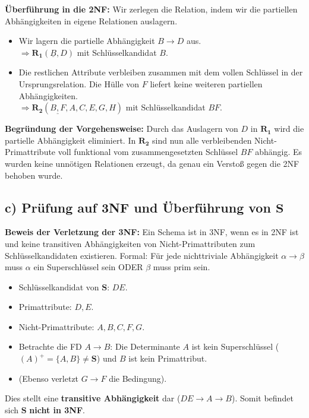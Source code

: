 \documentclass[12pt]{scrartcl}
\begin{document}
\textbf{Überführung in die 2NF:}
Wir zerlegen die Relation, indem wir die partiellen Abhängigkeiten in eigene Relationen auslagern.
\begin{itemize}
    \item Wir lagern die partielle Abhängigkeit $B \rightarrow D$ aus. \\
    $\Rightarrow \mathbf{R_1}(\underline{B}, D)$ mit Schlüsselkandidat $B$.
    \item Die restlichen Attribute verbleiben zusammen mit dem vollen Schlüssel in der Ursprungsrelation. Die Hülle von $F$ liefert keine weiteren partiellen Abhängigkeiten. \\
    $\Rightarrow \mathbf{R_2}(\underline{B, F}, A, C, E, G, H)$ mit Schlüsselkandidat $BF$.
\end{itemize}

\textbf{Begründung der Vorgehensweise:} Durch das Auslagern von $D$ in $\mathbf{R_1}$ wird die partielle Abhängigkeit eliminiert. In $\mathbf{R_2}$ sind nun alle verbleibenden Nicht-Primattribute voll funktional vom zusammengesetzten Schlüssel $BF$ abhängig. Es wurden keine unnötigen Relationen erzeugt, da genau ein Verstoß gegen die 2NF behoben wurde.

\vspace{0.5cm}

\subsection*{c) Prüfung auf 3NF und Überführung von $\mathbf{S}$}

\textbf{Beweis der Verletzung der 3NF:}
Ein Schema ist in 3NF, wenn es in 2NF ist und keine transitiven Abhängigkeiten von Nicht-Primattributen zum Schlüsselkandidaten existieren. Formal: Für jede nichttriviale Abhängigkeit $\alpha \rightarrow \beta$ muss $\alpha$ ein Superschlüssel sein ODER $\beta$ muss prim sein.
\begin{itemize}
    \item Schlüsselkandidat von $\mathbf{S}$: $DE$.
    \item Primattribute: $D, E$.
    \item Nicht-Primattribute: $A, B, C, F, G$.
    \item Betrachte die FD $A \rightarrow B$: Die Determinante $A$ ist kein Superschlüssel ($(A)^+ = \{A, B\} \neq \mathbf{S}$) und $B$ ist kein Primattribut.
    \item (Ebenso verletzt $G \rightarrow F$ die Bedingung).
\end{itemize}
Dies stellt eine \textbf{transitive Abhängigkeit} dar ($DE \rightarrow A \rightarrow B$). Somit befindet sich $\mathbf{S}$ \textbf{nicht in 3NF}.
\end{document}
